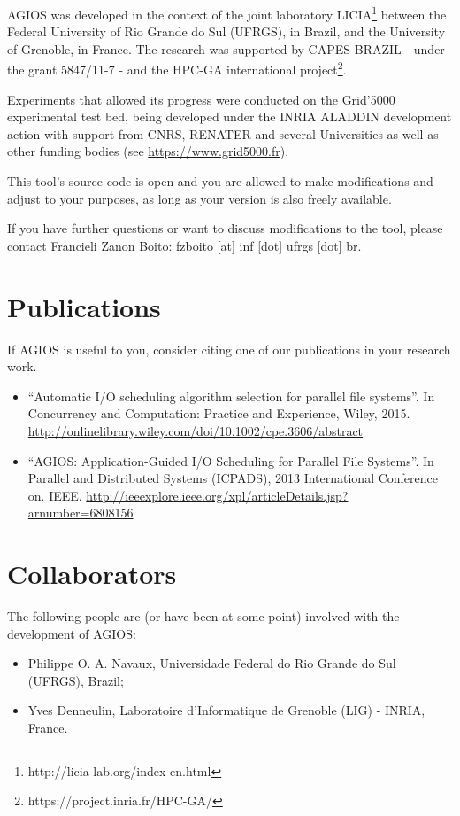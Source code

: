 AGIOS was developed in the context of the joint laboratory LICIA\footnote{http://licia-lab.org/index-en.html} between the Federal University of Rio Grande do Sul (UFRGS), in Brazil, and the University of Grenoble, in France. The research was supported by CAPES-BRAZIL - under the grant 5847/11-7 - and the HPC-GA international project\footnote{https://project.inria.fr/HPC-GA/}. 

Experiments that allowed its progress were conducted on the Grid'5000 experimental test bed, being
developed under the INRIA ALADDIN development action with support from
CNRS, RENATER and several Universities as well as other funding bodies
(see \url{https://www.grid5000.fr}).

This tool's source code is open and you are allowed to make modifications and adjust to your purposes, as long as your version is also freely available. 

If you have further questions or want to discuss modifications to the tool, please contact Francieli Zanon Boito: fzboito [at] inf [dot] ufrgs [dot] br.

\section{Publications}

If AGIOS is useful to you, consider citing one of our publications in your research work.

\begin{itemize}
\item ``Automatic I/O scheduling algorithm selection for parallel file systems''. In Concurrency and Computation: Practice and Experience, Wiley, 2015. \url{http://onlinelibrary.wiley.com/doi/10.1002/cpe.3606/abstract}
\item ``AGIOS: Application-Guided I/O Scheduling for Parallel File Systems''. In Parallel and Distributed Systems (ICPADS), 2013 International Conference on. IEEE. \url{http://ieeexplore.ieee.org/xpl/articleDetails.jsp?arnumber=6808156}
\end{itemize}

\section{Collaborators}

The following people are (or have been at some point) involved with the development of AGIOS:

\begin{itemize}
\item Philippe O. A. Navaux, Universidade Federal do Rio Grande do Sul (UFRGS), Brazil;
\item Yves Denneulin, Laboratoire d'Informatique de Grenoble (LIG) - INRIA, France.
\end{itemize}
